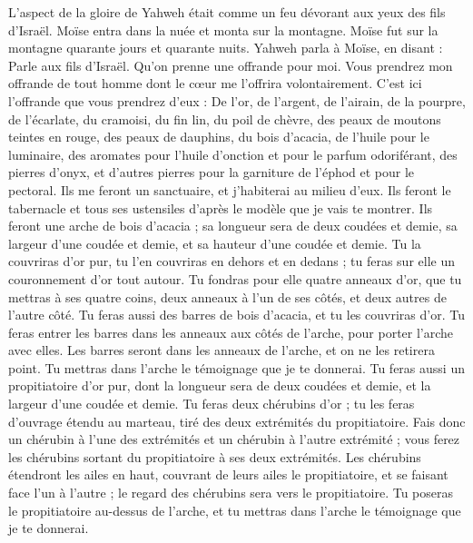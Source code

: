 \begin{multicols}{2}
L’aspect de la gloire de Yahweh était comme un feu dévorant aux yeux des fils d'Israël.
Moïse entra dans la nuée et monta sur la montagne. Moïse fut sur la montagne quarante jours et quarante nuits.
\VerseOne{}Yahweh parla à Moïse, en disant :
Parle aux fils d'Israël. Qu'on prenne une offrande pour moi. Vous prendrez mon offrande de tout homme dont le cœur me l'offrira volontairement.
C'est ici l'offrande que vous prendrez d'eux : De l'or, de l'argent, de l'airain,
de la pourpre, de l'écarlate, du cramoisi, du fin lin, du poil de chèvre,
des peaux de moutons teintes en rouge, des peaux de dauphins, du bois d’acacia,
de l'huile pour le luminaire, des aromates pour l'huile d'onction et pour le parfum odoriférant,
des pierres d'onyx, et d’autres pierres pour la garniture de l'éphod et pour le pectoral.
Ils me feront un sanctuaire, et j'habiterai au milieu d'eux.
Ils feront le tabernacle et tous ses ustensiles d’après le modèle que je vais te montrer.
Ils feront une arche de bois d’acacia ; sa longueur sera de deux coudées et demie, sa largeur d'une coudée et demie, et sa hauteur d'une coudée et demie.
Tu la couvriras d’or pur, tu l'en couvriras en dehors et en dedans ; tu feras sur elle un couronnement d'or tout autour.
Tu fondras pour elle quatre anneaux d'or, que tu mettras à ses quatre coins, deux anneaux à l'un de ses côtés, et deux autres de l'autre côté.
Tu feras aussi des barres de bois d’acacia, et tu les couvriras d'or.
Tu feras entrer les barres dans les anneaux aux côtés de l'arche, pour porter l'arche avec elles.
Les barres seront dans les anneaux de l'arche, et on ne les retirera point.
Tu mettras dans l'arche le témoignage que je te donnerai.
Tu feras aussi un propitiatoire d’or pur, dont la longueur sera de deux coudées et demie, et la largeur d'une coudée et demie.
Tu feras deux chérubins d'or ; tu les feras d'ouvrage étendu au marteau, tiré des deux extrémités du propitiatoire.
Fais donc un chérubin à l'une des extrémités et un chérubin à l'autre extrémité ; vous ferez les chérubins sortant du propitiatoire à ses deux extrémités.
Les chérubins étendront les ailes en haut, couvrant de leurs ailes le propitiatoire, et se faisant face l’un à l’autre ; le regard des chérubins sera vers le propitiatoire.
Tu poseras le propitiatoire au-dessus de l'arche, et tu mettras dans l'arche le témoignage que je te donnerai.

\end{multicols}
